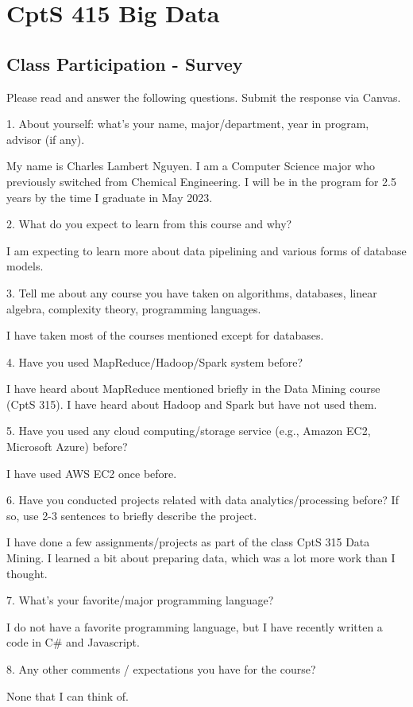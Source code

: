 \documentclass[12pt,letterpaper]{article}
\begin{document}
\section*{CptS 415 Big Data}
\subsection*{Class Participation - Survey}

\vspace{5mm} %

\hline

\vspace{5mm} %

Please read and answer the following questions. Submit the response via Canvas.

1. About yourself: what’s your name, major/department, year in program, advisor (if 
any).

My name is Charles Lambert Nguyen.  I am a Computer Science major who
previously switched from Chemical Engineering.  I will be in the program for
2.5 years by the time I graduate in May 2023.

2. What do you expect to learn from this course and why?

I am expecting to learn more about data pipelining and various forms of
database models.

3. Tell me about any course you have taken on algorithms, databases, linear algebra, 
complexity theory, programming languages.

I have taken most of the courses mentioned except for databases.

4. Have you used MapReduce/Hadoop/Spark system before?

I have heard about MapReduce mentioned briefly in the Data Mining course (CptS
315).  I have heard about Hadoop and Spark but have not used them.

5. Have you used any cloud computing/storage service (e.g., Amazon EC2, Microsoft 
Azure) before?

I have used AWS EC2 once before.

6. Have you conducted projects related with data analytics/processing before? If so, 
use 2-3 sentences to briefly describe the project.

I have done a few assignments/projects as part of the class CptS 315 Data
Mining.  I learned a bit about preparing data, which was a lot more work than
I thought.

7. What’s your favorite/major programming language?

I do not have a favorite programming language, but I have recently written a
code in C# and Javascript.

8. Any other comments / expectations you have for the course? 

None that I can think of.
\end{document}
